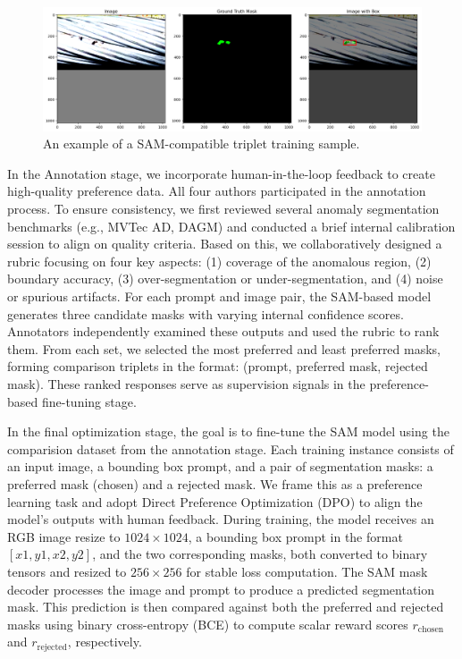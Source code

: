 \documentclass[11pt]{article}
\begin{document}
\begin{figure}[ht]
  \centering
  \includegraphics[width=1\linewidth]{figs/sam_triplet_sample.png}
  \caption{An example of a SAM-compatible triplet training sample.}
  \label{fig:sam_triplet}
\end{figure}


In the Annotation stage, we incorporate human-in-the-loop feedback to create high-quality preference data. All four authors participated in the annotation process. To ensure consistency, we first reviewed several anomaly segmentation benchmarks (e.g., MVTec AD, DAGM) and conducted a brief internal calibration session to align on quality criteria. Based on this, we collaboratively designed a rubric focusing on four key aspects: (1) coverage of the anomalous region, (2) boundary accuracy, (3) over-segmentation or under-segmentation, and (4) noise or spurious artifacts. For each prompt and image pair, the SAM-based model generates three candidate masks with varying internal confidence scores. Annotators independently examined these outputs and used the rubric to rank them. From each set, we selected the most preferred and least preferred masks, forming comparison triplets in the format: (prompt, preferred mask, rejected mask). These ranked responses serve as supervision signals in the preference-based fine-tuning stage.

In the final optimization stage, the goal is to fine-tune the SAM model using the comparision dataset from the annotation stage. Each training instance consists of an input image, a bounding box prompt, and a pair of segmentation masks: a preferred mask (chosen) and a rejected mask. We frame this as a preference learning task and adopt Direct Preference Optimization (DPO) to align the model’s outputs with human feedback. During training, the model receives an RGB image resize to $1024 \times 1024$, a bounding box prompt in the format $[x1, y1, x2, y2]$, and the two corresponding masks, both converted to binary tensors and resized to $256 \times 256$ for stable loss computation. The SAM mask decoder processes the image and prompt to produce a predicted segmentation mask. This prediction is then compared against both the preferred and rejected masks using binary cross-entropy (BCE) to compute scalar reward scores $r_{\text{chosen}}$ and $r_{\text{rejected}}$, respectively.
\end{document}
